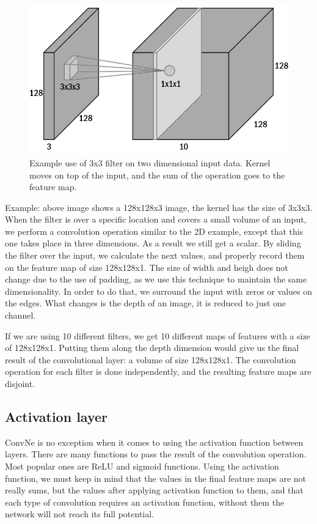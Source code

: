 \documentclass[conference]{IEEEtran}
\begin{document}
\begin{figure}[hbt!]
 \centering
    \includegraphics[scale=0.25]{3dkernel-b.png}
	    \caption{Example use of 3x3 filter on two dimensional input data. Kernel moves on top of the input, and the sum of the operation goes to the feature map.}
	    \label{fig:my_label}
\end{figure}

Example: above image shows a 128x128x3 image, the kernel has the size of 3x3x3. When the filter is over a specific location and covers a small volume of an input, we perform a convolution operation similar to the 2D example, except that this one takes place in three dimensions. As a result we still get a scalar. By sliding the filter over the input, we calculate the next values, and properly record them on the feature map of size 128x128x1. The size of width and heigh does not change due to the use of padding, as we use this technique to maintain the same dimensionality. In order to do that, we surround the input with zeros or values on the edges. What changes is the depth of an image, it is reduced to just one channel.

If we are using 10 different filters, we get 10 different maps of features with a size of 128x128x1. Putting them along the depth dimension would give us the final result of the convolutional layer: a volume of size 128x128x1. The convolution operation for each filter is done independently, and the resulting feature maps are disjoint.

\subsection{Activation layer}
ConvNe is no exception when it comes to using the activation function between layers. There are many functions to pass the result of the convolution operation. Most popular ones are ReLU and sigmoid functions. Using the activation function, we must keep in mind that the values in the final feature maps are not really sums, but the values after applying activation function to them, and that each type of convolution requires an activation function, without them the network will not reach its full potential.
\end{document}
